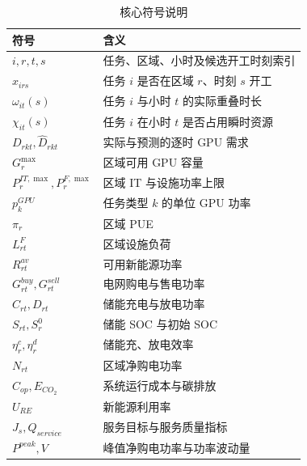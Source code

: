 \documentclass[withoutpreface,bwprint]{cumcmthesis}
\begin{document}
\begin{table}[H]\centering
\fontsize{8}{9}\selectfont
\renewcommand{\arraystretch}{0.88}
\caption{核心符号说明}\label{tab:symbols}
\begin{tabular}{p{}p{}}
\toprule
符号 & 含义\\
\midrule
$i,r,t,s$ & 任务、区域、小时及候选开工时刻索引\\
$x_{irs}$ & 任务 $i$ 是否在区域 $r$、时刻 $s$ 开工\\
$\omega_{it}(s)$ & 任务 $i$ 与小时 $t$ 的实际重叠时长\\
$\chi_{it}(s)$ & 任务 $i$ 在小时 $t$ 是否占用瞬时资源\\
$D_{rkt},\widehat D_{rkt}$ & 实际与预测的逐时 GPU 需求\\
$G_r^{\max}$ & 区域可用 GPU 容量\\
$P_r^{IT,\max},P_r^{F,\max}$ & 区域 IT 与设施功率上限\\
$p_k^{GPU}$ & 任务类型 $k$ 的单位 GPU 功率\\
$\pi_r$ & 区域 PUE\\
$L_{rt}^{F}$ & 区域设施负荷\\
$R_{rt}^{av}$ & 可用新能源功率\\
$G_{rt}^{buy},G_{rt}^{sell}$ & 电网购电与售电功率\\
$C_{rt},D_{rt}$ & 储能充电与放电功率\\
$S_{rt},S_r^0$ & 储能 SOC 与初始 SOC\\
$\eta_r^c,\eta_r^d$ & 储能充、放电效率\\
$N_{rt}$ & 区域净购电功率\\
$C_{op},E_{CO_2}$ & 系统运行成本与碳排放\\
$U_{RE}$ & 新能源利用率\\
$J_s,Q_{service}$ & 服务目标与服务质量指标\\
$P^{peak},V$ & 峰值净购电功率与功率波动量\\
\bottomrule
\end{tabular}
\end{table}
\end{document}

